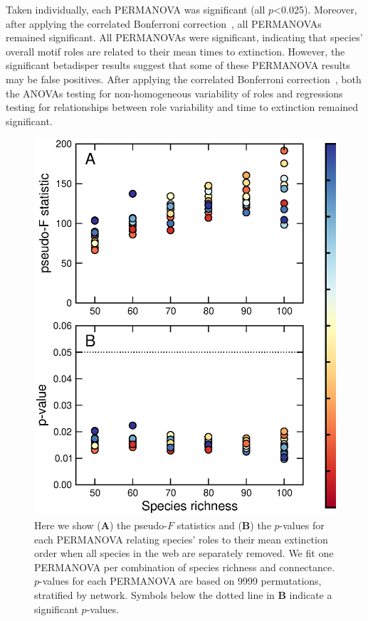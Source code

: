 \documentclass[12pt]{article}
\begin{document}
\begin{spacing}{2.0}
		Taken individually, each PERMANOVA was significant (all $p$\textless0.025). Moreover, after applying the correlated Bonferroni correction~\citep{Drezner2016}, all PERMANOVAs remained significant.
		All PERMANOVAs were significant, indicating that species' overall motif roles are related to their mean times to extinction.
		However, the significant betadisper results suggest that some of these PERMANOVA results may be false positives.
		After applying the correlated Bonferroni correction~\citep{Drezner2016}, both the ANOVAs testing for non-homogeneous variability of roles and regressions testing for relationships between role variability and time to extinction remained significant.


		\begin{figure}[h!]
			\caption{Here we show (\textbf{A}) the pseudo-$F$ statistics and (\textbf{B}) the $p$-values for each PERMANOVA relating species' roles to their mean extinction order when all species in the web are separately removed. We fit one PERMANOVA per combination of species richness and connectance. $p$-values for each PERMANOVA are based on 9999 permutations, stratified by network. Symbols below the dotted line in \textbf{B} indicate a significant $p$-values. }
			\label{permfig}
			\includegraphics[height=.5\textheight]{figures/extinction_order/permanova_summary_paper_full.eps}
			\end{figure}



\end{spacing}
\end{document}
